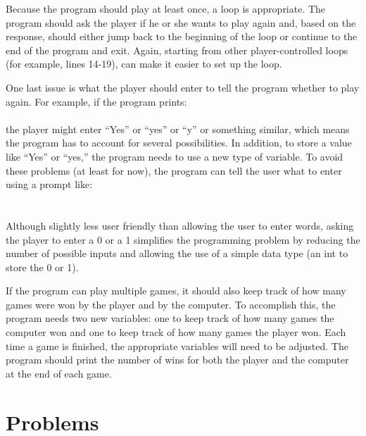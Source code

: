 Because the program should play at least once, a  loop is appropriate.  The program should ask the player if he or she wants to play again and, based on the response, should either jump back to the beginning of the loop or continue to the end of the program and exit.  Again, starting from other player-controlled loops (for example, lines 14-19), can make it easier to set up the loop.

One last issue is what the player should enter to tell the program whether to play again.  For example, if the program prints:\\
\\
the player might enter ``Yes'' or ``yes'' or ``y'' or something similar, which means the program has to account for several possibilities.  In addition, to store a value like ``Yes'' or ``yes,'' the program needs to use a new type of variable.  To avoid these problems (at least for now), the program can tell the user what to enter using a prompt like: \\
\\
\\
Although slightly less user friendly than allowing the user to enter words, asking the player to enter a 0 or a 1 simplifies the programming problem by reducing the number of possible inputs and allowing the use of a simple data type (an int to store the 0 or 1).

If the program can play multiple games, it should also keep track of how many games were won by the player and by the computer.  To accomplish this, the program needs two new variables: one to keep track of how many games the computer won and one to keep track of how many games the player won.  Each time a game is finished, the appropriate variables will need to be adjusted.
The program should print the number of wins for both the player and the computer at the end of each game.

\section{Problems}

